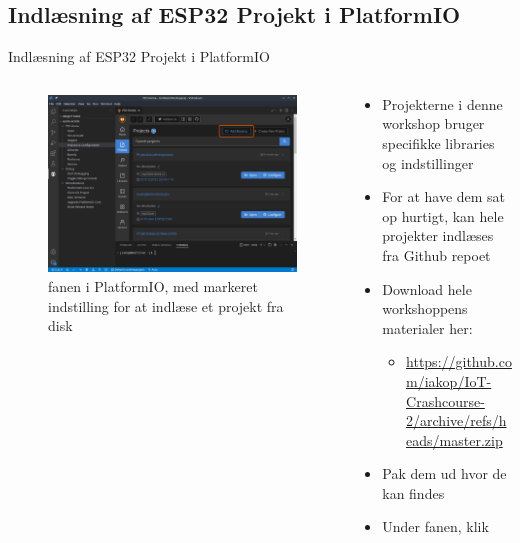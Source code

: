 \documentclass[aspectratio=169]{beamer}
\begin{document}
\subsection{Indlæsning af ESP32 Projekt i PlatformIO}
\begin{frame}{Indlæsning af ESP32 Projekt i PlatformIO}
\begin{columns}
	\begin{column}{0.5\textwidth}
		\begin{figure}
  			\includegraphics[width=\textwidth,keepaspectratio=true]{assets/pictures/pio-project-4.png}
  			\caption{ fanen i PlatformIO, med markeret indstilling for at indlæse et projekt fra disk}
  			\label{fig:pio-project4}
		\end{figure}
	\end{column}
	\begin{column}{0.5\textwidth}
		\begin{textBox}
			\begin{itemize}
				\item Projekterne i denne workshop bruger specifikke libraries og indstillinger
				\item For at have dem sat op hurtigt, kan hele projekter indlæses fra Github repoet
				\item Download hele workshoppens materialer her:
				\begin{itemize}
					\item \small\url{https://github.com/iakop/IoT-Crashcourse-2/archive/refs/heads/master.zip}
				\end{itemize}
				\item Pak dem ud hvor de kan findes
				\item Under  fanen, klik 
			\end{itemize}
		\end{textBox}
	\end{column}
\end{columns}
\end{frame}
\end{document}

